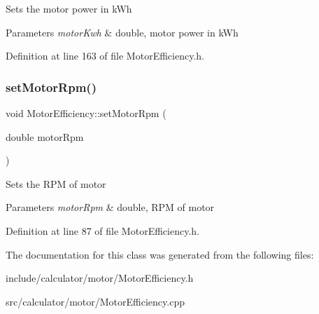 Sets the motor power in k\+Wh


\begin{DoxyParams}{Parameters}
{\em motor\+Kwh} & double, motor power in k\+Wh \\
\hline
\end{DoxyParams}


Definition at line 163 of file Motor\+Efficiency.\+h.

\mbox{\label{class_motor_efficiency_a2c4ddf9f2f3e44c098dad91a0ddbaf21}} 
\subsubsection{\texorpdfstring{set\+Motor\+Rpm()}{setMotorRpm()}}
{\footnotesize\ttfamily void Motor\+Efficiency\+::set\+Motor\+Rpm (\begin{DoxyParamCaption}\item[{double}]{motor\+Rpm }\end{DoxyParamCaption})\hspace{0.3cm}{\ttfamily [inline]}}

Sets the R\+PM of motor


\begin{DoxyParams}{Parameters}
{\em motor\+Rpm} & double, R\+PM of motor \\
\hline
\end{DoxyParams}


Definition at line 87 of file Motor\+Efficiency.\+h.



The documentation for this class was generated from the following files\+:\begin{DoxyCompactItemize}
\item 
include/calculator/motor/Motor\+Efficiency.\+h\item 
src/calculator/motor/Motor\+Efficiency.\+cpp\end{DoxyCompactItemize}
